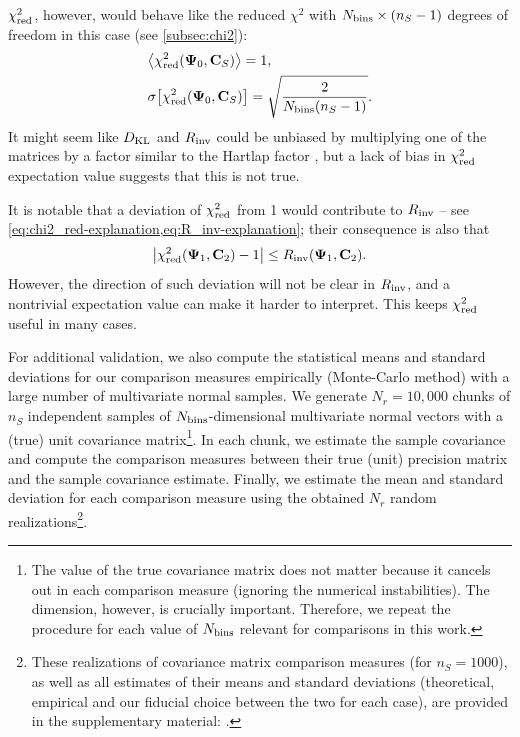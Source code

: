 $\chi^2_{\rm red}$, however, would behave like the reduced $\chi^2$ with $N_{\rm bins} \times (n_S-1)$ degrees of freedom in this case (see \cref{subsec:chi2}):
\begin{align} \label{eq:chi2_red-stats}
& {\left\langle \chi^2_{\rm red} {\left( {\bf \Psi}_0, {\bf C}_S \right)} \right\rangle} = 1, \nonumber \\
& \sigma {\left[ \chi^2_{\rm red} {\left( {\bf \Psi}_0, {\bf C}_S \right)} \right]} = \sqrt{\frac2{N_{\rm bins} (n_S-1)}}.
\end{align}
It might seem like $D_{\rm KL}$ and $R_{\rm inv}$ could be unbiased by multiplying one of the matrices by a factor similar to the Hartlap factor \citep{hartlap-factor}, but a lack of bias in $\chi^2_{\rm red}$ expectation value suggests that this is not true.

It is notable that a deviation of $\chi^2_{\rm red}$ from 1 would contribute to $R_{\rm inv}$ -- see \cref{eq:chi2_red-explanation,eq:R_inv-explanation}; their consequence is also that
\begin{equation} \label{eq:chi2_red-R_inv-limit}
{\left| \chi^2_{\rm red} {\left( {\bf \Psi}_1, {\bf C}_2 \right)} - 1 \right|} \le R_{\rm inv} {\left( {\bf \Psi}_1, {\bf C}_2 \right)}.
\end{equation}
However, the direction of such deviation will not be clear in $R_{\rm inv}$, and a nontrivial expectation value can make it harder to interpret.
This keeps $\chi^2_{\rm red}$ useful in many cases.

For additional validation, we also compute the statistical means and standard deviations for our comparison measures empirically (Monte-Carlo method) with a large number of multivariate normal samples.
We generate $N_r=10,000$ chunks of $n_S$ independent samples of $N_{\rm bins}$-dimensional multivariate normal vectors with a (true) unit covariance matrix\footnote{The value of the true covariance matrix does not matter because it cancels out in each comparison measure (ignoring the numerical instabilities).
The dimension, however, is crucially important.
Therefore, we repeat the procedure for each value of $N_{\rm bins}$ relevant for comparisons in this work.}.
In each chunk, we estimate the sample covariance and compute the comparison measures between their true (unit) precision matrix and the sample covariance estimate.
Finally, we estimate the mean and standard deviation for each comparison measure using the obtained $N_r$ random realizations\footnote{These realizations of covariance matrix comparison measures (for $n_S=1000$), as well as all estimates of their means and standard deviations (theoretical, empirical and our fiducial choice between the two for each case), are provided in the supplementary material: \supplementarylink{}.}.
    
